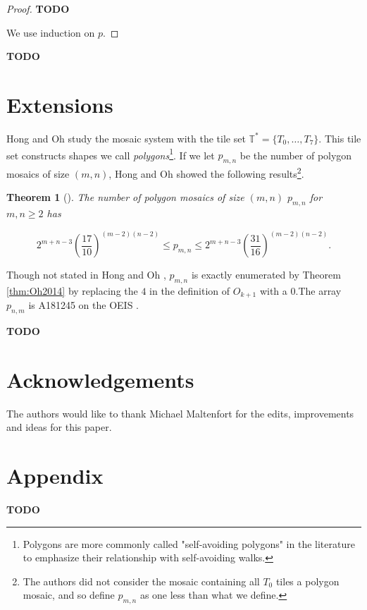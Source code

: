 \documentclass[12pt]{article}
\theoremstyle{plain}
\newtheorem{thm}{Theorem}[section]
\theoremstyle{definition}
\theoremstyle{remark}
\theoremstyle{definition}
\begin{document}
\begin{proof}
    \textbf{TODO}
    
    We use induction on $p$. 
\end{proof}

\textbf{TODO}



\section{Extensions}
\label{section: Extensions}

Hong and Oh \cite{Hong2018} study the mosaic system with the tile set $\mathbb{T}^* = \{T_0, \dots,T_7\}$. This tile set constructs shapes we call \textit{polygons}\footnote{Polygons are more commonly called "self-avoiding polygons" in the literature to emphasize their relationship with self-avoiding walks.}. If we let $p_{m,n}$ be the number of polygon mosaics of size $(m,n)$, Hong and Oh showed the following results\footnote{The authors did not consider the mosaic containing all $T_0$ tiles a polygon mosaic, and so define $p_{m,n}$ as one less than what we define.}. 

\begin{thm}[\cite{Hong2018}]
    \label{thm:Hong2018}
    The number of polygon mosaics of size $(m,n)$ $p_{m,n}$ for $m,n \geq 2$ has

    $$2^{m+n-3} \left(\frac{17}{10}\right)^{(m-2)(n-2)} \leq p_{m,n} \leq 2^{m+n-3} \left(\frac{31}{16}\right)^{(m-2)(n-2)}.$$
\end{thm}

Though not stated in Hong and Oh \cite{Hong2018}, $p_{m,n}$ is exactly enumerated by Theorem \ref{thm:Oh2014} by replacing the $4$ in the definition of $O_{k+1}$ with a $0$.The array $p_{n,m}$ is A181245 on the OEIS \cite[OEIS]{oeis}. 

\textbf{TODO}

\section{Acknowledgements}

The authors would like to thank Michael Maltenfort for the edits, improvements and ideas for this paper. 

\newpage

\printbibliography

\section{Appendix}

\textbf{TODO}
\end{document}

